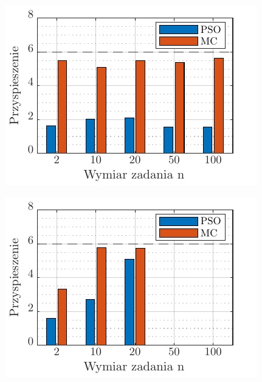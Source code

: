 \documentclass[11pt, a4paper, oneside]{article}
\begin{document}
\begin{figure}[H]
\centering
\begin{minipage}[b]{\dimexpr.5\textwidth-1em}
  \centering
  \includegraphics[width=1\linewidth]{grafiki2/przyspieszenieMPI1.pdf}
  \label{fig:przysp:zad1}
\end{minipage} \hfill
\begin{minipage}[b]{\dimexpr.5\textwidth-1em}
  \centering
  \includegraphics[width=1\linewidth]{grafiki2/przyspieszenieMPI2.pdf}
  \label{fig:przysp:zad2}
\end{minipage}
\end{figure}
\end{document}

